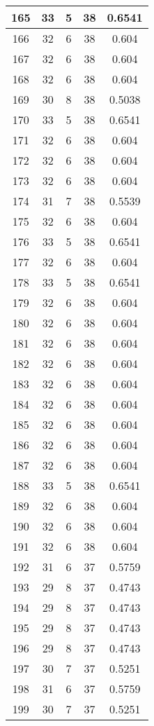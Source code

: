 \documentclass[letterpaper, 12pt]{article}
\begin{document}
\begin{longtable}{|c|c|c|c|c|}
\hline
165 & 33 & 5 & 38 & 0.6541 \\
\hline
166 & 32 & 6 & 38 & 0.604 \\
\hline
167 & 32 & 6 & 38 & 0.604 \\
\hline
168 & 32 & 6 & 38 & 0.604 \\
\hline
169 & 30 & 8 & 38 & 0.5038 \\
\hline
170 & 33 & 5 & 38 & 0.6541 \\
\hline
171 & 32 & 6 & 38 & 0.604 \\
\hline
172 & 32 & 6 & 38 & 0.604 \\
\hline
173 & 32 & 6 & 38 & 0.604 \\
\hline
174 & 31 & 7 & 38 & 0.5539 \\
\hline
175 & 32 & 6 & 38 & 0.604 \\
\hline
176 & 33 & 5 & 38 & 0.6541 \\
\hline
177 & 32 & 6 & 38 & 0.604 \\
\hline
178 & 33 & 5 & 38 & 0.6541 \\
\hline
179 & 32 & 6 & 38 & 0.604 \\
\hline
180 & 32 & 6 & 38 & 0.604 \\
\hline
181 & 32 & 6 & 38 & 0.604 \\
\hline
182 & 32 & 6 & 38 & 0.604 \\
\hline
183 & 32 & 6 & 38 & 0.604 \\
\hline
184 & 32 & 6 & 38 & 0.604 \\
\hline
185 & 32 & 6 & 38 & 0.604 \\
\hline
186 & 32 & 6 & 38 & 0.604 \\
\hline
187 & 32 & 6 & 38 & 0.604 \\
\hline
188 & 33 & 5 & 38 & 0.6541 \\
\hline
189 & 32 & 6 & 38 & 0.604 \\
\hline
190 & 32 & 6 & 38 & 0.604 \\
\hline
191 & 32 & 6 & 38 & 0.604 \\
\hline
192 & 31 & 6 & 37 & 0.5759 \\
\hline
193 & 29 & 8 & 37 & 0.4743 \\
\hline
194 & 29 & 8 & 37 & 0.4743 \\
\hline
195 & 29 & 8 & 37 & 0.4743 \\
\hline
196 & 29 & 8 & 37 & 0.4743 \\
\hline
197 & 30 & 7 & 37 & 0.5251 \\
\hline
198 & 31 & 6 & 37 & 0.5759 \\
\hline
199 & 30 & 7 & 37 & 0.5251 \\
\hline
\end{longtable}
\end{document}
